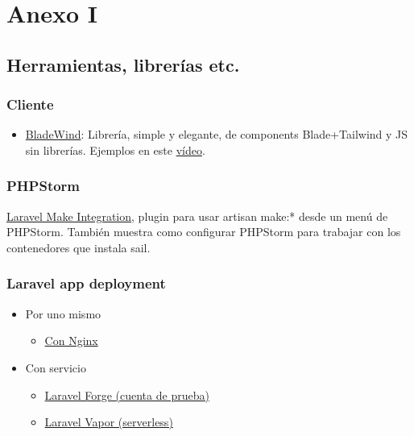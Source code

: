 \documentclass[11pt]{article}
\begin{document}
\newpage


\section{Anexo I}
\label{sec:org85ac027}
\subsection{Herramientas, librerías etc.}
\label{sec:orgcb8bd9c}
\subsubsection{Cliente}
\label{sec:orgece1460}
\begin{itemize}
\item \href{https://bladewindui.com/}{BladeWind}: Librería, simple y elegante, de components
Blade+Tailwind y JS sin librerías. Ejemplos en este \href{https://www.youtube.com/watch?v=UoKa5aKkv1U}{vídeo}.
\end{itemize}

\subsubsection{PHPStorm}
\label{sec:org5148a8b}
\href{https://github.com/NiclasvanEyk/jetbrains-laravel-make-integration/blob/main/docs/setup\_with\_sail.md}{Laravel Make Integration}, plugin para usar artisan make:* desde un
menú de PHPStorm. También muestra como configurar PHPStorm para
trabajar con los contenedores que instala sail.

\subsubsection{Laravel app deployment}
\label{sec:org34c4f02}
\begin{itemize}
\item Por uno mismo
\begin{itemize}
\item \href{https://laravel.com/docs/9.x/deployment}{Con Nginx}
\end{itemize}
\item Con servicio
\begin{itemize}
\item \href{https://bootcamp.laravel.com/deploying}{Laravel Forge (cuenta de prueba)}
\item \href{https://vapor.laravel.com/}{Laravel Vapor (serverless)}
\end{itemize}
\end{itemize}
\end{document}
